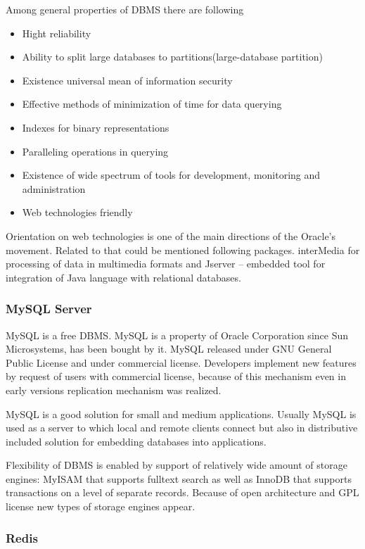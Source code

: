 \documentclass[thesis=M,english]{FITthesis}[2012/10/20]
\begin{document}
Among general properties of DBMS there are following

\begin{itemize}
	\item Hight reliability
	\item Ability to split large databases to partitions(large-database partition) 
	\item Existence universal mean of information security
	\item Effective methods of minimization of time for data querying 
	\item Indexes for binary representations
	\item Paralleling operations in querying
	\item Existence of wide spectrum of tools for development, monitoring and administration
	\item Web technologies friendly
\end{itemize}

Orientation on web technologies is one of the main directions of the Oracle's movement. Related to that could be mentioned following packages. interMedia for processing of data in multimedia formats and Jserver -- embedded tool for integration of Java language with relational databases.

\subsubsection{MySQL Server}

MySQL is a free DBMS. MySQL is a property of Oracle Corporation since Sun Microsystems, has been bought by it. MySQL released under GNU General Public License and under commercial license. Developers implement new features by request of users with commercial license, because of this mechanism even in early versions replication mechanism was realized.

MySQL is a good solution for small and medium applications. Usually MySQL is used as a server to which local and remote clients connect but also in distributive included solution for embedding databases into applications.

Flexibility of DBMS is enabled by support of relatively wide amount of storage engines: MyISAM that supports fulltext search as well as InnoDB that supports transactions on a level of separate records. Because of open architecture and GPL license new types of storage engines appear.

\subsubsection{Redis}
\end{document}
